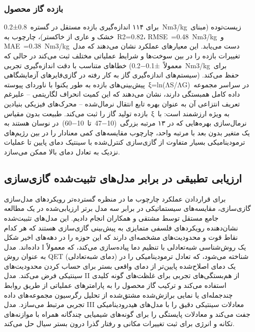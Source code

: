 \documentclass[12pt, a4paper]{article}
\begin{document}
\subsubsection{بازده گاز محصول}

برای ۱۱۴ اندازه‌گیری بازده مستقل در گستره 0.8±0.2 Nm3/kg زیست‌توده (مبنای خشک و عاری از خاکستر)، چارچوب به R2=0.82، RMSE =0.48 Nm3/kg و MAE =0.38 Nm3/kg دست می‌یابد. این معیارهای عملکرد نشان می‌دهند که مدل تغییرات بازده را در بین سوخت‌ها و شرایط عملیاتی مختلف ثبت می‌کند در حالی که خطاهای متناسب با دقت اندازه‌گیری تجربی (معمولاً ±0.1−0.2 Nm3/kg برای سیستم‌های اندازه‌گیری گاز به کار رفته در گازی‌فایرهای آزمایشگاهی) حفظ می‌کند. پیش‌بینی‌های بازده به طور یکنوا با ناوردای پیوسته ξ=ln(ΛS/ΛG) در سراسر مجموعه داده کامل همبستگی دارند، نشان می‌دهند که این کمیت انحراف لگاریتمی – علیرغم تعریف انتزاعی آن به عنوان بهره تابع انتقال نرمال‌شده – محرک‌های فیزیکی بنیادین بازده تولید گاز را ثبت می‌کند. طبیعت بدون مقیاس ξ به ویژه ارزشمند است: با نرمال‌سازی بهره‌هایی که در ۱۳ مرتبه بزرگی (10−47 تا 10−60) در نوسان هستند به یک متغیر بدون بعد با مرتبه واحد، چارچوب مقایسه‌های کمی معنادار را در بین رژیم‌های ترمودینامیکی بسیار متفاوت از گازی‌سازی کنترل‌شده با سینتیک دمای پایین تا عملیات نزدیک به تعادل دمای بالا ممکن می‌سازد.

\subsection{ارزیابی تطبیقی در برابر مدل‌های تثبیت‌شده گازی‌سازی}

برای قراردادن عملکرد چارچوب ما در منظره گسترده‌تر رویکردهای مدل‌سازی گازی‌سازی، مقایسه‌های سیستماتیکی در برابر سه مدل برتر ارزیابی‌شده در یک مطالعه جامع مستقل توسط مشتقی و همکاران انجام دادیم. این مدل‌های تثبیت‌شده نشان‌دهنده رویکردهای فلسفی متمایزی به پیش‌بینی گازی‌سازی هستند که هر کدام نقاط قوت و محدودیت‌های مشخصه‌ای دارند که این حوزه را در دهه‌های اخیر شکل داده‌اند. مدل I یک روش‌شناسی شبه‌تعادلی با تنظیم دما پیاده‌سازی می‌کند، که معمولاً به عنوان روش QET (دمای شبه‌تعادلی) شناخته می‌شود، که تعادل ترمودینامیکی را در یک دمای اصلاح‌شده پایین‌تر از دمای واقعی بستر برای حساب کردن محدودیت‌های سینتیکی فرض می‌کند. مدل II از هم‌بستگی‌های تجربی برای غلظت‌های گونه کلیدی استفاده می‌کند و ترکیب گاز محصول را به پارامترهای عملیاتی از طریق روابط چندجمله‌ای یا نمایی برازش‌شده مشتق‌شده از تحلیل رگرسیون مجموعه‌های داده تجربی مرتبط می‌سازد. مدل III معادلات سینتیکی دقیق را با مدل‌های هیدرودینامیکی جفت می‌کند و معادلات پایستگی را برای گونه‌های شیمیایی چندگانه همراه با موازنه‌های تکانه و انرژی برای ثبت تغییرات مکانی و رفتار گذرا درون بستر سیال حل می‌کند.
\end{document}
